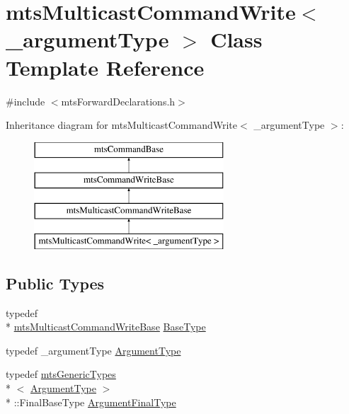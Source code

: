 \hypertarget{classmts_multicast_command_write}{\section{mts\-Multicast\-Command\-Write$<$ \-\_\-argument\-Type $>$ Class Template Reference}
\label{classmts_multicast_command_write}
}


{\ttfamily \#include $<$mts\-Forward\-Declarations.\-h$>$}

Inheritance diagram for mts\-Multicast\-Command\-Write$<$ \-\_\-argument\-Type $>$\-:\begin{figure}[H]
\begin{center}
\leavevmode
\includegraphics[height=4.000000cm]{d2/ddb/classmts_multicast_command_write}
\end{center}
\end{figure}
\subsection*{Public Types}
\begin{DoxyCompactItemize}
\item 
typedef \\*
\hyperlink{classmts_multicast_command_write_base}{mts\-Multicast\-Command\-Write\-Base} \hyperlink{classmts_multicast_command_write_aa950168043db4770666c31d84145a37a}{Base\-Type}
\item 
typedef \-\_\-argument\-Type \hyperlink{classmts_multicast_command_write_a064ab3c37be15f5f41dc6fd39595f207}{Argument\-Type}
\item 
typedef \hyperlink{classmts_generic_types}{mts\-Generic\-Types}\\*
$<$ \hyperlink{classmts_multicast_command_write_a064ab3c37be15f5f41dc6fd39595f207}{Argument\-Type} $>$\\*
\-::Final\-Base\-Type \hyperlink{classmts_multicast_command_write_a6a53ad6556ef466ffc58b8800ca81f46}{Argument\-Final\-Type}
\end{DoxyCompactItemize}
